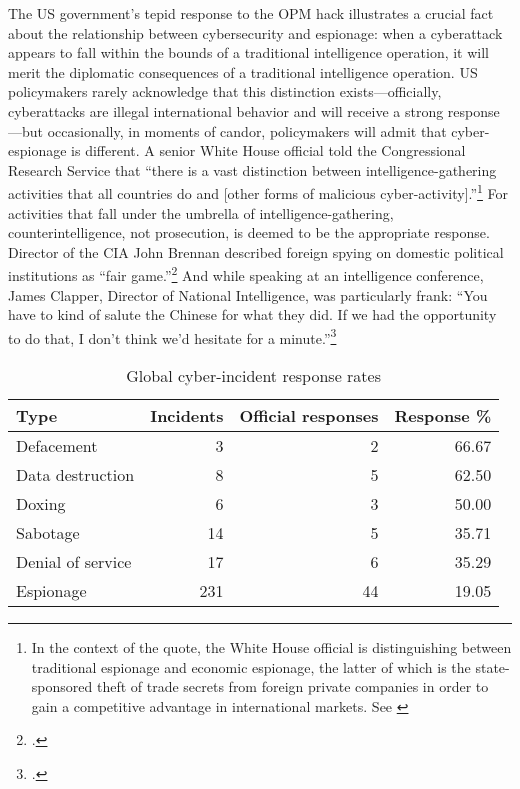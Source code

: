 \documentclass[14pt]{extarticle}
\begin{document}
The US government's tepid response to the OPM hack illustrates a crucial fact about the relationship between cybersecurity and espionage: when a cyberattack appears to fall within the bounds of a traditional intelligence operation, it will merit the diplomatic consequences of a traditional intelligence operation. US policymakers rarely acknowledge that this distinction exists---officially, cyberattacks are illegal international behavior and will receive a strong response---but occasionally, in moments of candor, policymakers will admit that cyber-espionage is different. A senior White House official told the Congressional Research Service that \enquote{there is a vast distinction between intelligence-gathering activities that all countries do and [other forms of malicious cyber-activity].}\footnote{In the context of the quote, the White House official is distinguishing between traditional espionage and economic espionage, the latter of which is the state-sponsored theft of trade secrets from foreign private companies in order to gain a competitive advantage in international markets. See \cite{finklea_cyber_2015}} For activities that fall under the umbrella of intelligence-gathering, counterintelligence, not prosecution, is deemed to be the appropriate response. Director of the CIA John Brennan described foreign spying on domestic political institutions as \enquote{fair game.}\footcite{sanger_u.s._2016} And while speaking at an intelligence conference, James Clapper, Director of National Intelligence, was particularly frank: \enquote{You have to kind of salute the Chinese for what they did. If we had the opportunity to do that, I don’t think we’d hesitate for a minute.}\footcite{pepitone_clapper_2015}

\begin{table}[ht]
\centering
\begin{tabular}{lrrr}
  \hline
Type & Incidents & Official responses & Response \% \\
  \hline
Defacement &   3 &   2 & 66.67 \\
  Data destruction &   8 &   5 & 62.50 \\
  Doxing &   6 &   3 & 50.00 \\
  Sabotage &  14 &   5 & 35.71 \\
  Denial of service &  17 &   6 & 35.29 \\
  Espionage & 231 &  44 & 19.05 \\
   \hline
\end{tabular}
\caption{Global cyber-incident response rates}
\label{response-pct}
\end{table}
\end{document}
